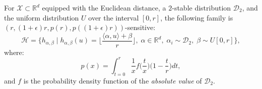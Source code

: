 \begin{theorem}
    For $\mathcal{X} \subset \mathbb{R}^d$ equipped with the Euclidean distance,
    a $2$-stable distribution $\mathcal{D}_2$, and the uniform distribution $U$ over
    the interval $[0, r]$,
    the following family is $(r, (1 + \epsilon)r, p(r), p((1 + \epsilon) r))$-sensitive:
    \begin{equation*}
     \mathcal{H} = \{ h_{\alpha, \beta} \;|\; h_{\alpha, \beta}(u) = 
    \lfloor \frac{\langle \alpha, u \rangle + \beta }{r} \rfloor, \; \alpha \in \mathbb{R}^d,\; \alpha_i \sim \mathcal{D}_2,\;
    \beta \sim U[0, r] \},
    \end{equation*}
    where:
    \begin{equation*}
        p(x) = \int_{t=0}^{r} \frac{1}{x} f\Big( \frac{t}{x} \Big) \Big( 1 - \frac{t}{r} \Big) dt,
    \end{equation*}
    and $f$ is the probability density function of the \emph{absolute value} of $\mathcal{D}_2$.
\end{theorem}
